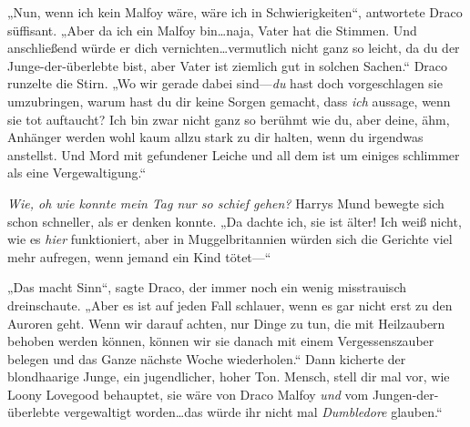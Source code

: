 „Nun, wenn ich kein Malfoy wäre, wäre ich in Schwierigkeiten“, antwortete Draco süffisant. „Aber da ich ein Malfoy bin…naja, Vater hat die Stimmen. Und anschließend würde er dich vernichten…vermutlich nicht ganz so leicht, da du der Junge-der-überlebte bist, aber Vater ist ziemlich gut in solchen Sachen.“ Draco runzelte die Stirn. „Wo wir gerade dabei sind—\emph{du} hast doch vorgeschlagen sie umzubringen, warum hast du dir keine Sorgen gemacht, dass \emph{ich} aussage, wenn sie tot auftaucht? Ich bin zwar nicht ganz so berühmt wie du, aber deine, ähm, Anhänger werden wohl kaum allzu stark zu dir halten, wenn du irgendwas anstellst. Und Mord mit gefundener Leiche und all dem ist um einiges schlimmer als eine Vergewaltigung.“

\emph{Wie, oh wie konnte mein Tag nur so schief gehen?} Harrys Mund bewegte sich schon schneller, als er denken konnte. „Da dachte ich, sie ist älter! Ich weiß nicht, wie es \emph{hier} funktioniert, aber in Muggelbritannien würden sich die Gerichte viel mehr aufregen, wenn jemand ein Kind tötet—“

„Das macht Sinn“, sagte Draco, der immer noch ein wenig misstrauisch dreinschaute.
„Aber es ist auf jeden Fall schlauer, wenn es gar nicht erst zu den Auroren geht. Wenn wir darauf achten, nur Dinge zu tun, die mit Heilzaubern behoben werden können, können wir sie danach mit einem Vergessenszauber belegen und das Ganze nächste Woche wiederholen.“
Dann kicherte der blondhaarige Junge, ein jugendlicher, hoher Ton.
Mensch, stell dir mal vor, wie Loony Lovegood behauptet, sie wäre von Draco Malfoy \emph{und} vom Jungen-der-überlebte vergewaltigt worden…das würde ihr nicht mal \emph{Dumbledore} glauben.“

